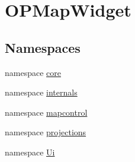 \hypertarget{group___o_p_map_widget}{\section{O\-P\-Map\-Widget}
\label{group___o_p_map_widget}
}
\subsection*{Namespaces}
\begin{DoxyCompactItemize}
\item 
namespace \hyperlink{namespacecore}{core}
\item 
namespace \hyperlink{namespaceinternals}{internals}
\item 
namespace \hyperlink{namespacemapcontrol}{mapcontrol}
\item 
namespace \hyperlink{namespaceprojections}{projections}
\item 
namespace \hyperlink{namespace_ui}{Ui}
\end{DoxyCompactItemize}
